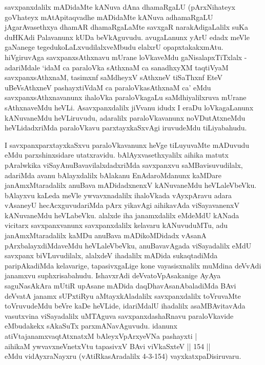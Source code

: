 \begin{artha}%
savxpanxdalilx mADidaMte kANuva dAna dhamaRgaLU (pArxNihateyx goVhateyx mAtApitaqvadhe mADidaMte kANuva adhamaRgaLU jAgarAvasethxya dhamAR dhamaRgaLaMte savxgaR narakAdigaLalilx suKa duHKAdi Palavanunx kUDa beVkAguvudu. avugaLanunx yArU edadx meVle gaNanege tegedukoLaLxvudilalxveMbudu elalxrU opapxtakakxmAtu. hiVgiruvAga savxpanxsAthxnavu mUrane loVkaveMdu gaNisalapxTiTxlalx - adariMdale `idaM ca paraloVka sAthxnaM ca sanadhxyXM taqtiVyaM savxpanxsAthxnaM, tasimxnf saMdheyxV sAthxneV tiSaThxnf EteV uBeVsAthxneV pashayxtiVdaM ca paraloVkasAthxnaM ca' eMdu savxpanxsAthxnavanunx ihaloVka paraloVkagaLu saMdhiyalilxruva mUrane sAthxnaveMdu heVLi. Asavxpanxdalilx jiVvanu idudx I eraDu loVkagaLanunx kANuvaneMdu heVLiruvudu, adaralilx paraloVkavanunx noVDutAtxneMdu heVLidadxriMda paraloVkavu parxtayxkaSxvAgi iruvudeMdu tiLiyabahudu. 
\end{artha}

\begin{artha}
I savxpanxparxtayxkaSxvu paraloVkavanunx heVge tiLuyuvaMte mADuvudu eMdu parxshinxsidare utatxravidu. bAlAyxvasethxyalilx aihika matutx pAralwkika viSayAnuBavavilalxdadxriMda savxpanxvu saMBavisuvudilalx, adariMda avanu bAlayxdalilx bAlakanu EnAdaroMdanunx kaMDare janAmxMtaradalilx anuBava mADidadxnenxV kANuvaneMdu heVLaleVbeVku. bAlayxvu kaLeda meVle ywvavxnadalilx ihaloVkada vAyxpAravu adara vAsaneyU hecAcxguvudariMda pArx yikavAgi aihikavAda viSayavanenxV kANuvaneMdu heVLabeVku. alalxde iha janamxdalilx eMdeMdU kANada vicitarx savxpanxvanunx savxpanxdalilx kelavaru kANuvuduMTu, adu janAmxMtaradalilx kaMDu anuBava mADikoMDidadx vAsanA pArxbalayxdiMdaveMdu heVLaleVbeVku, anuBavavAgada viSayadalilx eMdU savxpanx biVLuvudilalx, alalxdeV ihadalilx mADida sukaqtadiMda paripAkadiMda kelavarige, tapasivxgaLige kone vayasisxnalilx muMdina deVvAdi janamxvu suphxrisabahudu. IshavxrAdi deVvatoVpAsakanige AyAya saguNasAkAra mUtiR upAsane mADida daqDhavAsanAbaladiMda BAvi deVvatA janamx sUPxtiRyu aMtayxkAladalilx savxpanxdalilx toVruvaMte toVruvudeMdu beVre kaDe heVLide, idariMdalU ihadalilx asaMBAvitavAda vasutxvina viSayadalilx uMTAguva savxpanxdashaRnavu paraloVkavide eMbudakekx sAkaSuTx parxmANavAguvudu. idanunx\\ atiVtajanamxvaqtAtxnatxM bAleyxVpArxyeVNa pashayxti |\\
aihikaM ywvavxneV\s netxVtu tapasivxV BAvi viVkaSxteV || 154 ||\\ eMdu vidAyxraNayxru (vAtiRkasAradalilx 4-3-154) vayxkatxpaDisiruvaru.
\end{artha}%

